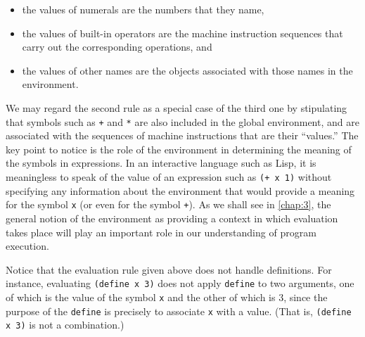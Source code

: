 \begin{itemize}
\item the values of numerals are the numbers that they name,
\item the values of built-in operators are the machine instruction
  sequences that carry out the corresponding operations, and
\item the values of other names are the objects associated with those
  names in the environment.
\end{itemize}

We may regard the second rule as a special case of the third one by
stipulating that symbols such as \texttt{+} and \texttt{*} are also
included in the global environment, and are associated with the
sequences of machine instructions that are their ``values.''  The key
point to notice is the role of the environment in determining the
meaning of the symbols in expressions.  In an interactive language
such as Lisp, it is meaningless to speak of the value of an expression
such as \texttt{(+ x 1)} without specifying any information about the
environment that would provide a meaning for the symbol \texttt{x} (or
even for the symbol \texttt{+}).  As we shall see in \ref{chap:3}, the
general notion of the environment as providing a context in which
evaluation takes place will play an important role in our
understanding of program execution.

Notice that the evaluation rule given above does not handle
definitions.  For instance, evaluating \texttt{(define x 3)} does not
apply \texttt{define} to two arguments, one of which is the value of
the symbol \texttt{x} and the other of which is 3, since the purpose
of the \texttt{define} is precisely to associate \texttt{x} with a
value.  (That is, \texttt{(define x 3)} is not a combination.)

